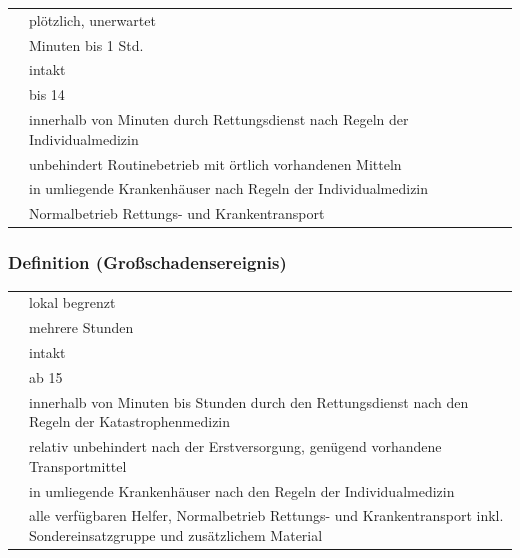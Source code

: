 \begin{tabulary}{\linewidth}{LL}
\toprule
{}
 &
pl\"otzlich, unerwartet
\\\addlinespace
{}
 &
Minuten bis 1 Std.
\\\addlinespace
{}
 &
intakt
\\\addlinespace
{}
 &
bis 14
\\\addlinespace
{}
 &
innerhalb von Minuten durch Rettungsdienst nach Regeln der
Individual\-medizin
\\\addlinespace
{}
 &
unbehindert Routinebetrieb mit \"ortlich vorhandenen Mitteln
\\\addlinespace
{}
 &
in umliegende Krankenh\"auser nach Regeln der Individualmedizin
\\\addlinespace
{}
 &
Normalbetrieb Rettungs- und Krankentransport
\\\bottomrule
\end{tabulary}

\subsubsection{Definition 
(Gro{\ss}schadensereignis)}



\begin{tabulary}{\linewidth}{LL}
\toprule
{}
 &
lokal begrenzt
\\\addlinespace
{}
 &
mehrere Stunden
\\\addlinespace
{}
 &
intakt
\\\addlinespace
{}
 &
ab 15
\\\addlinespace
{}
 &
innerhalb von Minuten bis Stunden durch den Rettungsdienst nach den
Regeln der Katastrophenmedizin
\\\addlinespace
{}
 &
relativ unbehindert nach der Erstversorgung, gen\"ugend vorhandene
Transportmittel
\\\addlinespace
{}
 &
in umliegende Krankenh\"auser nach den Regeln der Individualmedizin
\\\addlinespace
{}
 &
alle verf\"ugbaren Helfer, Normalbetrieb Rettungs- und Krankentransport
inkl. Sondereinsatzgruppe und zus\"atzlichem Material
\\\bottomrule
\end{tabulary}


